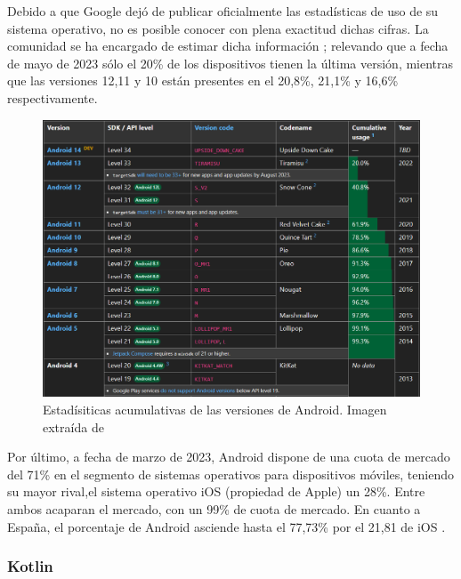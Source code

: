             Debido a que Google dejó de publicar oficialmente las estadísticas de uso de su sistema operativo, no es
            posible conocer con plena exactitud dichas cifras. La comunidad se ha encargado de estimar dicha 
            información \cite{belinski_android_nodate}; relevando que a fecha de mayo de 2023 sólo el 20\% de los 
            dispositivos tienen la última versión, mientras que las versiones 12,11 y 10 están presentes en el 
            20,8\%, 21,1\% y 16,6\% respectivamente. 

            \begin{figure}[H]
                \centering
                \includegraphics[width=1\textwidth]{figures/Android usage.PNG}
                \caption[Estadísiticas acumulativas de las versiones de Android]
                {Estadísiticas acumulativas de las versiones de Android. Imagen extraída de \cite{belinski_android_nodate}}
                \label{figure:android:usage}
            \end{figure}

            Por último, a fecha de marzo de 2023, Android dispone de una cuota de mercado del 71\% en el segmento de sistemas 
            operativos para dispositivos móviles, teniendo su mayor rival,el sistema operativo iOS (propiedad de Apple) 
            un 28\%. Entre ambos acaparan el mercado, con un 99\% de cuota de mercado. En cuanto a España, el 
            porcentaje de Android asciende hasta el 77,73\% por el 21,81 de iOS \cite{press_asi_2023}.

        \subsubsection{Kotlin}

